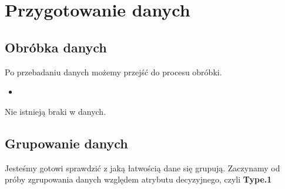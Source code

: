 \documentclass{article}
\newcommand{\rscript}[2]{
\begin{itemize}
\item[]
\end{itemize}
}
\begin{document}
\section{Przygotowanie danych}

\subsection{Obróbka danych}
Po przebadaniu danych możemy przejść do procesu obróbki. 

\rscript{obrob}{Obrabianie danych}

Nie istnieją braki w danych. 

\clearpage
\subsection{Grupowanie danych}

Jesteśmy gotowi sprawdzić z jaką łatwością dane się grupują.
Zaczynamy od próby zgrupowania danych względem atrybutu decyzyjnego, czyli \textbf{Type.1}
\end{document}
